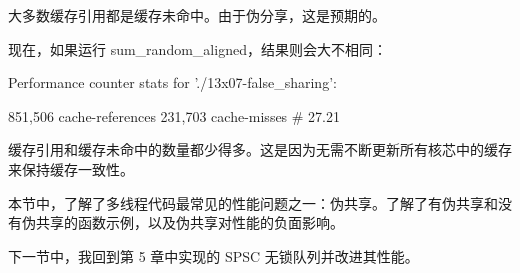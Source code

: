 大多数缓存引用都是缓存未命中。由于伪分享，这是预期的。

现在，如果运行 sum\_random\_aligned，结果则会大不相同：

\begin{shell}
Performance counter stats for './13x07-false_sharing':

          851,506    cache-references
          231,703    cache-misses
                     # 27.21%
\end{shell}

缓存引用和缓存未命中的数量都少得多。这是因为无需不断更新所有核芯中的缓存来保持缓存一致性。

本节中，了解了多线程代码最常见的性能问题之一：伪共享。了解了有伪共享和没有伪共享的函数示例，以及伪共享对性能的负面影响。

下一节中，我回到第 5 章中实现的 SPSC 无锁队列并改进其性能。















